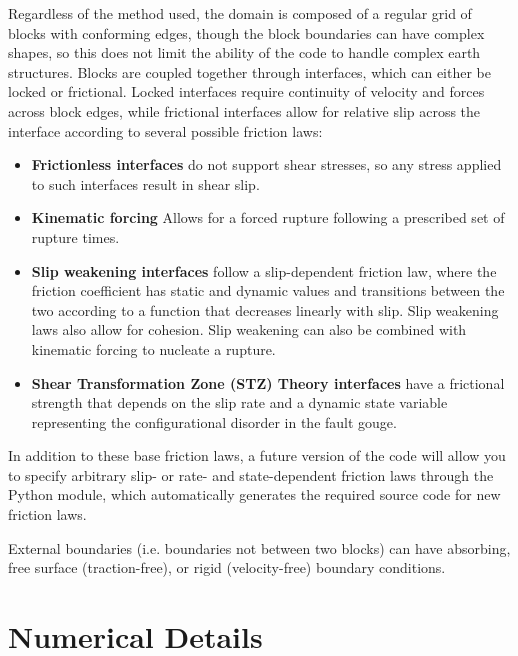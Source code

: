 \documentclass[12pt]{article}   	%
\begin{document}
Regardless of the method used, the domain is composed of a regular grid of blocks with conforming edges, though the block boundaries can have complex shapes, so this does not limit the ability of the code to handle complex earth structures.  Blocks are coupled together through interfaces, which can either be locked or frictional. Locked interfaces require continuity of velocity and forces across block edges, while frictional interfaces allow for relative slip across the interface according to several possible friction laws:

\begin{itemize}
\item {\bf Frictionless interfaces} do not support shear stresses, so any stress applied to such interfaces result in shear slip.
\item {\bf Kinematic forcing} Allows for a forced rupture following a prescribed set of rupture times.
\item {\bf Slip weakening interfaces} follow a slip-dependent friction law, where the friction coefficient has static and dynamic values and transitions between the two according to a function that decreases linearly with slip. Slip weakening laws also allow for cohesion. Slip weakening can also be combined with kinematic forcing to nucleate a rupture.
\item {\bf Shear Transformation Zone (STZ) Theory interfaces} have a frictional strength that depends on the slip rate and a dynamic state variable representing the configurational disorder in the fault gouge.
\end{itemize}

In addition to these base friction laws, a future version of the code will allow you to specify arbitrary slip- or rate- and state-dependent friction laws through the Python module, which automatically generates the required source code for new friction laws.

External boundaries (i.e. boundaries not between two blocks) can have absorbing, free surface (traction-free), or rigid (velocity-free) boundary conditions.

\section{Numerical Details}
\end{document}
